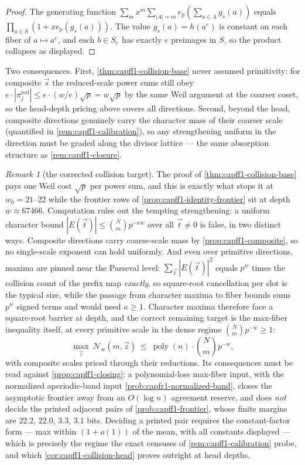 \documentclass[11pt]{article}
\theoremstyle{definition}
\theoremstyle{remark}
\newtheorem{remark}[remark]{Remark}
\begin{document}
\begin{proof}
The generating function $\sum_m x^m\sum_{|A|=m}e_p(\sum_{a\in A}g_s(a))$ equals $\prod_{a\in S}(1+xe_p(g_s(a)))$.  The value $g_s(a)=h(a^e)$ is constant on each fiber of $a\mapsto a^e$, and each $b\in S_e$ has exactly $e$ preimages in $S$, so the product collapses as displayed.
\end{proof}

Two consequences.  First, \cref{thm:capff1-collision-base} never assumed primitivity: for composite $\vec s$ the reduced-scale power sums still obey $e\cdot|\pi^{\mathrm{red}}_j|\le e\cdot(w/e)\sqrt p=w\sqrt p$ by the same Weil argument at the coarser coset, so the head-depth pricing above covers all directions.  Second, beyond the head, composite directions genuinely carry the character mass of their coarser scale \textup{(quantified in \cref{rem:capff1-calibration})}, so any strengthening uniform in the direction must be graded along the divisor lattice --- the same absorption structure as \cref{rem:capff1-closure}.

\begin{remark}[the corrected collision target]\label{rem:capff1-collision-gap}
The proof of \cref{thm:capff1-collision-base} pays one Weil cost $\sqrt p$ per power sum, and this is exactly what stops it at $w_0=21$--$22$ while the frontier rows of \cref{prop:capff1-identity-frontier} sit at depth $w\approx67466$.  Computation rules out the tempting strengthening: a uniform character bound $|E(\vec t)|\le\binom Nm p^{-\kappa w}$ over all $\vec t\ne0$ is false, in two distinct ways.  Composite directions carry coarse-scale mass by \cref{prop:capff1-composite}, so no single-scale exponent can hold uniformly.  And even over primitive directions, maxima are pinned near the Parseval level: $\sum_{\vec t}|E(\vec t)|^2$ equals $p^w$ times the collision count of the prefix map \emph{exactly}, so square-root cancellation per slot is the typical size, while the passage from character maxima to fiber bounds sums $p^w$ signed terms and would need $\kappa\ge1$.  Character maxima therefore face a square-root barrier at depth, and the correct remaining target is the max-fiber inequality itself, at every primitive scale in the dense regime $\binom Nmp^{-w}\ge1$:
\[
        \max_{\vec z}\ \mathcal N_w(m,\vec z)\ \le\ \operatorname{poly}(n)\cdot\binom Nm p^{-w},
\]
with composite scales priced through their reductions.  Its consequences must be read against \cref{prop:capff1-closing}: a polynomial-loss max-fiber input, with the normalized aperiodic-band input \cref{prob:capfr1-normalized-band}, closes the asymptotic frontier away from an $O(\log n)$ agreement reserve, and does \emph{not} decide the printed adjacent pairs of \cref{prob:capff1-frontier}, whose finite margins are $22.2$, $22.0$, $3.3$, $3.1$ bits.  Deciding a printed pair requires the constant-factor form --- max within $(1+o(1))$ of the mean, with all constants displayed --- which is precisely the regime the exact censuses of \cref{rem:capff1-calibration} probe, and which \cref{cor:capff1-collision-head} proves outright at head depths.
\end{remark}
\end{document}
